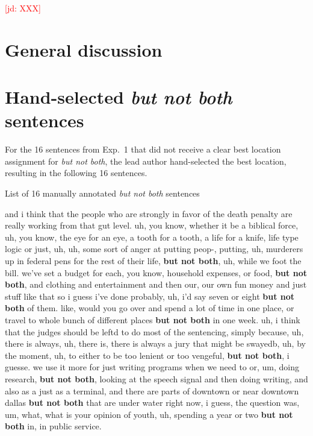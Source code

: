 \documentclass[11pt,letterpaper]{article}
\newcommand{\jd}[1]{\textcolor{Red}{[jd: #1]}}
\begin{document}
\jd{XXX}

\section{General discussion}

\appendix

\section{Hand-selected \emph{but not both} sentences}
\label{app:handselectedbnb}

For the 16 sentences from Exp.~1 that did not receive a clear best location assignment for \emph{but not both}, the lead author hand-selected the best location, resulting in the following 16 sentences.

\begin{exe}
	\ex List of 16 manually annotated \emph{but not both} sentences
	\begin{xlist}
	\ex and i think that the people who are strongly in favor of the death penalty are really working from that gut level. uh, you know, whether it be a biblical force, uh, you know, the eye for an eye, a tooth for a tooth, a life for a knife, life type logic or just, uh, uh, some sort of anger at putting peop-, putting, uh, murderers up in federal pens for the rest of their life, \textbf{but not both}, uh, while we foot the bill.
	\ex we've set a budget for each, you know, household expenses, or food, \textbf{but not both}, and clothing and entertainment and then our, our own fun money and just stuff like that
	\ex so i guess i've done probably, uh, i'd say seven or eight \textbf{but not both} of them.
	\ex like, would you go over and spend a lot of time in one place, or travel to whole bunch of different places \textbf{but not both} in one week.
	\ex uh, i think that the judges should be leftd to do most of the sentencing, simply because, uh, there is always, uh, there is, there is always a jury that might be swayedb, uh, by the moment, uh, to either to be too lenient or too vengeful, \textbf{but not both}, i guesse.
	\ex we use it more for just writing programs when we need to or, um, doing research, \textbf{but not both}, looking at the speech signal and then doing writing, and also as a just as a terminal,
	\ex and there are parts of downtown or near downtown dallas \textbf{but not both} that are under water right now, i guess,
	\ex the question was, um, what, what is your opinion of youth, uh, spending a year or two \textbf{but not both} in, in public service.

\end{xlist}
\end{exe}
\end{document}

